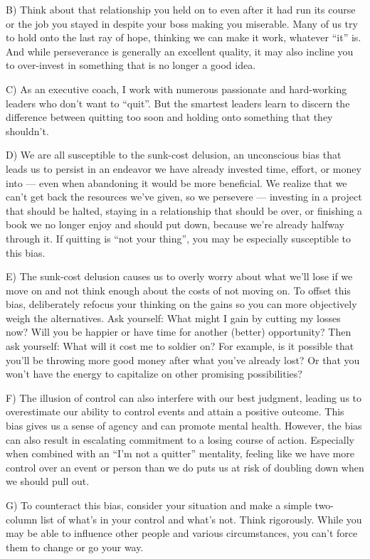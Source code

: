 \documentclass[UTF8,11pt]{ctexart}
\begin{document}
B) Think about that relationship you held on to even after it had run its course or the job you stayed in despite your boss making you miserable. Many of us try to hold onto the last ray of hope, thinking we can make it work, whatever “it” is. And while perseverance is generally an excellent quality, it may also incline you to over-invest in something that is no longer a good idea.


C) As an executive coach, I work with numerous passionate and hard-working leaders who don’t want to “quit”. But the smartest leaders learn to discern the difference between quitting too soon and holding onto something that they shouldn’t.


D) We are all susceptible to the sunk-cost delusion, an unconscious bias that leads us to persist in an endeavor we have already invested time, effort, or money into — even when abandoning it would be more beneficial. We realize that we can’t get back the resources we’ve given, so we persevere — investing in a project that should be halted, staying in a relationship that should be over, or finishing a book we no longer enjoy and should put down, because we’re already halfway through it. If quitting is “not your thing”, you may be especially susceptible to this bias.


E) The sunk-cost delusion causes us to overly worry about what we’ll lose if we move on and not think enough about the costs of not moving on. To offset this bias, deliberately refocus your thinking on the gains so you can more objectively weigh the alternatives. Ask yourself: What might I gain by cutting my losses now? Will you be happier or have time for another (better) opportunity? Then ask yourself: What will it cost me to soldier on? For example, is it possible that you’ll be throwing more good money after what you’ve already lost? Or that you won’t have the energy to capitalize on other promising possibilities?


F) The illusion of control can also interfere with our best judgment, leading us to overestimate our ability to control events and attain a positive outcome. This bias gives us a sense of agency and can promote mental health. However, the bias can also result in escalating commitment to a losing course of action. Especially when combined with an “I’m not a quitter” mentality, feeling like we have more control over an event or person than we do puts us at risk of doubling down when we should pull out.


G) To counteract this bias, consider your situation and make a simple two-column list of what’s in your control and what’s not. Think rigorously. While you may be able to influence other people and various circumstances, you can’t force them to change or go your way.
\end{document}
